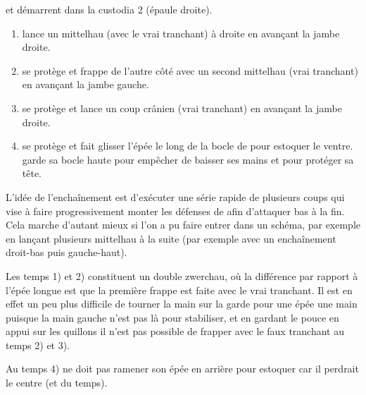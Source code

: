 \begin{technique}[Liegniczer 4]
\label{épée-bocle:tech:liegniczer:4}

\A et \D démarrent dans la custodia 2 (épaule droite).

\begin{enumerate}
	\item \A lance un mittelhau (avec le vrai tranchant) à droite en avançant la jambe droite.
	
	\item \D se protège et \A frappe de l'autre côté avec un second mittelhau (vrai tranchant) en avançant la jambe gauche.
	
	\item \D se protège et \A lance un coup crânien (vrai tranchant) en avançant la jambe droite.
	
	\item \D se protège et \A fait glisser l'épée le long de la bocle de \D pour estoquer le ventre.
		\A garde sa bocle haute pour empêcher \D de baisser ses mains et pour protéger sa tête.
\end{enumerate}

L'idée de l'enchaînement est d'exécuter une série rapide de plusieurs coups qui vise à faire progressivement monter les défenses de \D afin d'attaquer bas à la fin.
Cela marche d'autant mieux si l'on a pu faire entrer \D dans un schéma, par exemple en lançant plusieurs mittelhau à la suite (par exemple avec un enchaînement droit-bas puis gauche-haut).

Les temps 1) et 2) constituent un double zwerchau, où la différence par rapport à l'épée longue est que la première frappe est faite avec le vrai tranchant.
Il est en effet un peu plus difficile de tourner la main sur la garde pour une épée une main puisque la main gauche n'est pas là pour stabiliser, et en gardant le pouce en appui sur les quillons il n'est pas possible de frapper avec le faux tranchant au temps 2) et 3).

Au temps 4) \A ne doit pas ramener son épée en arrière pour estoquer car il perdrait le centre (et du temps).

\end{technique}


